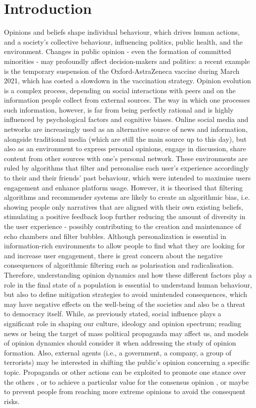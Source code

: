\documentclass[10pt,letterpaper]{article}
\begin{document}
\section{Introduction}
Opinions and beliefs shape individual behaviour, which drives human actions, and a society's collective behaviour, influencing politics, public health, and the environment. Changes in public opinion - even the formation of committed minorities - may profoundly affect decision-makers and politics: a recent example is the temporary suspension of the Oxford-AstraZeneca vaccine during March 2021, which has costed a slowdown in the vaccination strategy. Opinion evolution is a complex process, depending on social interactions with peers and on the information people collect from external sources. 
The way in which one processes such information, however, is far from being perfectly rational and is highly influenced by psychological factors and cognitive biases. 
Online social media and networks are increasingly used as an alternative source of news and information, alongside traditional media (which are still the main source up to this day), but also as an environment to express personal opinions, engage in discussion, share content from other sources with one's personal network. These environments are ruled by algorithms that filter and personalise each user's experience accordingly to their and their friends' past behaviour, which were intended to maximise users engagement and enhance platform usage. However, it is theorised that filtering algorithms and recommender systems are likely to create an algorithmic bias, i.e. showing people only narratives that are aligned with their own existing beliefs, stimulating a positive feedback loop further reducing the amount of diversity in the user experience - possibly contributing to the creation and maintenance of echo chambers and filter bubbles. Although personalization is essential in information-rich environments to allow people to find what they are looking for and increase user engagement, there is great concern about the negative consequences of algorithmic filtering such as polarisation and radicalisation. 
Therefore, understanding opinion dynamics and how these different factors play a role in the final state of a population is essential to understand human behaviour, but also to define mitigation strategies to avoid unintended consequences, which may have negative effects on the well-being of the societies and also be a threat to democracy itself. 
While, as previously stated, social influence plays a significant role in shaping our culture, ideology and opinion spectrum; reading news or being the target of mass political propaganda may affect us, and models of opinion dynamics should consider it when addressing the study of opinion formation. Also, external agents (i.e., a government, a company, a group of terrorists) may be interested in shifting the public's opinion concerning a specific topic. Propaganda or other actions can be exploited to promote one stance over the others \cite{Franke2015StrategiesOP}, or to achieve a particular value for the consensus opinion \cite{Lorenz2007AboutTP}, or maybe to prevent people from reaching more extreme opinions \cite{Timothy2017HowDP} to avoid the consequent risks.
\end{document}
